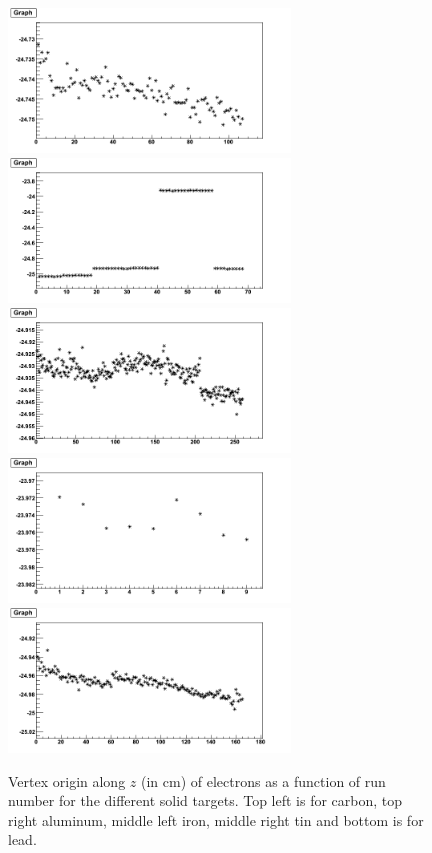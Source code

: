 \begin{figure}[tbp]
\centering
\includegraphics[width=7.5cm] {answer-fig/VertexC.png} 
\includegraphics[width=7.5cm] {answer-fig/VertexAl.png} 
\includegraphics[width=7.5cm] {answer-fig/VertexFe.png} 
\includegraphics[width=7.5cm] {answer-fig/VertexSn.png} 
\includegraphics[width=7.5cm] {answer-fig/VertexPb.png} 
\caption {Vertex origin along $z$ (in cm) of electrons as a function of run 
number for the different solid targets. Top left is for carbon, top right
aluminum, middle left iron, middle right tin and bottom is for lead.}
\label{VertexSolid}
\end{figure}

